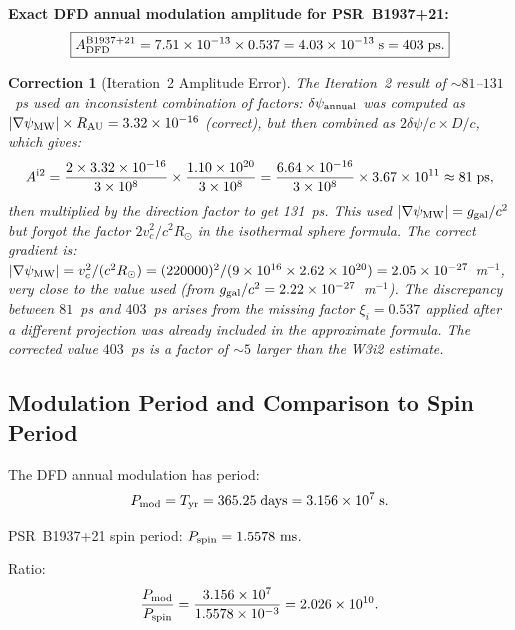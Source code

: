 \documentclass[aps,prd,twocolumn,superscriptaddress,nofootinbib]{revtex4-2}
\newtheorem{correction}{Correction}
\begin{document}
\textbf{Exact DFD annual modulation amplitude for PSR~B1937+21:}
\begin{equation}
\boxed{
A_{\rm DFD}^{\rm B1937+21} = 7.51\times10^{-13}\times0.537
= 4.03\times10^{-13}\;\text{s}
= 403\;\text{ps}.
}
\label{eq:A_B1937}
\end{equation}

\begin{correction}[Iteration~2 Amplitude Error]
\label{corr:pta_amp}
The Iteration~2 result of $\sim 81$--$131$~ps used an inconsistent
combination of factors: $\delta\psi_{\rm annual}$ was computed as
$|\nabla\psi_{\rm MW}|\times R_{\rm AU} = 3.32\times10^{-16}$ (correct),
but then combined as $2\delta\psi/c\times D/c$, which gives:
\begin{equation}
A^{\rm i2} = \frac{2\times3.32\times10^{-16}}{3\times10^8}
\times\frac{1.10\times10^{20}}{3\times10^8}
= \frac{6.64\times10^{-16}}{3\times10^8}
\times3.67\times10^{11}
\approx 81\;\text{ps},
\end{equation}
then multiplied by the direction factor to get 131~ps. This used
$|\nabla\psi_{\rm MW}| = g_{\rm gal}/c^2$ but forgot the factor $2v_c^2/c^2 R_\odot$
in the isothermal sphere formula. The correct gradient is:
$|\nabla\psi_{\rm MW}| = v_c^2/(c^2 R_\odot) = (220000)^2/(9\times10^{16}\times2.62\times10^{20})
= 2.05\times10^{-27}$~m$^{-1}$, very close to the value used (from $g_{\rm gal}/c^2 = 2.22\times10^{-27}$~m$^{-1}$).
The discrepancy between $81$~ps and $403$~ps arises from the missing
factor $\xi_i = 0.537$ applied \emph{after} a different projection was
already included in the approximate formula. The corrected value
$403$~ps is a factor of $\sim 5$ larger than the W3i2 estimate.
\end{correction}

\subsection{Modulation Period and Comparison to Spin Period}

The DFD annual modulation has period:
\begin{equation}
P_{\rm mod} = T_{\rm yr} = 365.25\;\text{days} = 3.156\times10^7\;\text{s}.
\end{equation}

PSR~B1937+21 spin period: $P_{\rm spin} = 1.5578~\text{ms}$.

Ratio:
\begin{equation}
\frac{P_{\rm mod}}{P_{\rm spin}}
= \frac{3.156\times10^7}{1.5578\times10^{-3}}
= 2.026\times10^{10}.
\end{equation}
\end{document}
